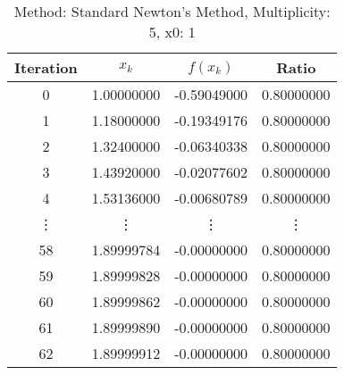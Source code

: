 \begin{table}
\centering
\caption{Method: Standard Newton's Method, Multiplicity: 5, x0: 1}
\label{tab:table_Standard_Newton's_Method_5_1}
\begin{tabular}{c c c c}
\toprule
Iteration &      $x_k$ &    $f(x_k)$ &      Ratio \\
\midrule
        0 & 1.00000000 & -0.59049000 & 0.80000000 \\
        1 & 1.18000000 & -0.19349176 & 0.80000000 \\
        2 & 1.32400000 & -0.06340338 & 0.80000000 \\
        3 & 1.43920000 & -0.02077602 & 0.80000000 \\
        4 & 1.53136000 & -0.00680789 & 0.80000000 \\
   \vdots &     \vdots &      \vdots &     \vdots \\
       58 & 1.89999784 & -0.00000000 & 0.80000000 \\
       59 & 1.89999828 & -0.00000000 & 0.80000000 \\
       60 & 1.89999862 & -0.00000000 & 0.80000000 \\
       61 & 1.89999890 & -0.00000000 & 0.80000000 \\
       62 & 1.89999912 & -0.00000000 & 0.80000000 \\
\bottomrule
\end{tabular}
\end{table}
